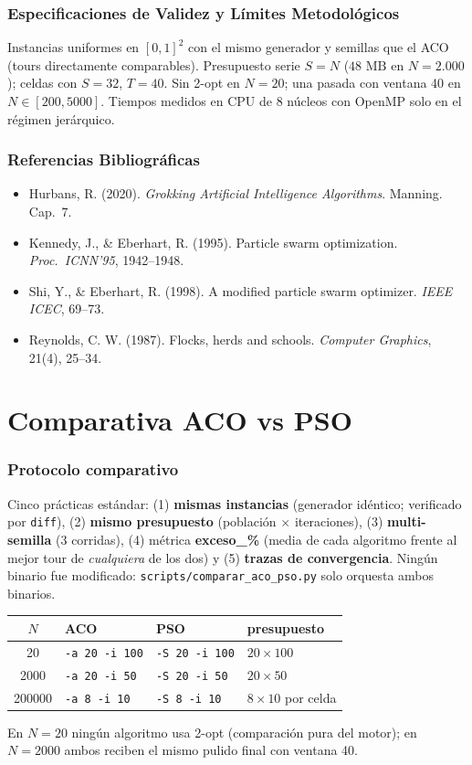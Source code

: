 \documentclass[11pt,a4paper]{article}
\begin{document}
\section*{Especificaciones de Validez y Límites Metodológicos}
Instancias uniformes en $[0,1]^2$ con el mismo generador y semillas que el ACO (tours directamente comparables). Presupuesto serie $S=N$ ($48\text{ MB}$ en $N=2.000$); celdas con $S=32$, $T=40$. Sin 2-opt en $N=20$; una pasada con ventana 40 en $N\in[200,5000]$. Tiempos medidos en CPU de 8 núcleos con OpenMP solo en el régimen jerárquico.

\section*{Referencias Bibliográficas}
\begin{itemize}
    \item Hurbans, R. (2020). \textit{Grokking Artificial Intelligence Algorithms}. Manning. Cap.~7.
    \item Kennedy, J., \& Eberhart, R. (1995). Particle swarm optimization. \textit{Proc.\ ICNN'95}, 1942--1948.
    \item Shi, Y., \& Eberhart, R. (1998). A modified particle swarm optimizer. \textit{IEEE ICEC}, 69--73.
    \item Reynolds, C. W. (1987). Flocks, herds and schools. \textit{Computer Graphics}, 21(4), 25--34.
\end{itemize}

\part{Comparativa ACO vs PSO}%

\section{Protocolo comparativo}
Cinco prácticas estándar: (1) \textbf{mismas instancias} (generador idéntico; verificado por \texttt{diff}), (2) \textbf{mismo presupuesto} (población $\times$ iteraciones), (3) \textbf{multi-semilla} (3 corridas), (4) métrica \textbf{exceso\_\%} (media de cada algoritmo frente al mejor tour de \textit{cualquiera} de los dos) y (5) \textbf{trazas de convergencia}. Ningún binario fue modificado: \texttt{scripts/comparar\_aco\_pso.py} solo orquesta ambos binarios.
\begin{center}
\begin{tabular}{@{}clll@{}}
\toprule $N$ & ACO & PSO & presupuesto \\
\midrule 20 & \texttt{-a 20 -i 100} & \texttt{-S 20 -i 100} & $20\times100$ \\
2000 & \texttt{-a 20 -i 50} & \texttt{-S 20 -i 50} & $20\times50$ \\
200000 & \texttt{-a 8 -i 10} & \texttt{-S 8 -i 10} & $8\times10$ por celda \\
\bottomrule
\end{tabular}
\end{center}
En $N{=}20$ ningún algoritmo usa 2-opt (comparación pura del motor); en $N{=}2000$ ambos reciben el mismo pulido final con ventana 40.
\end{document}
